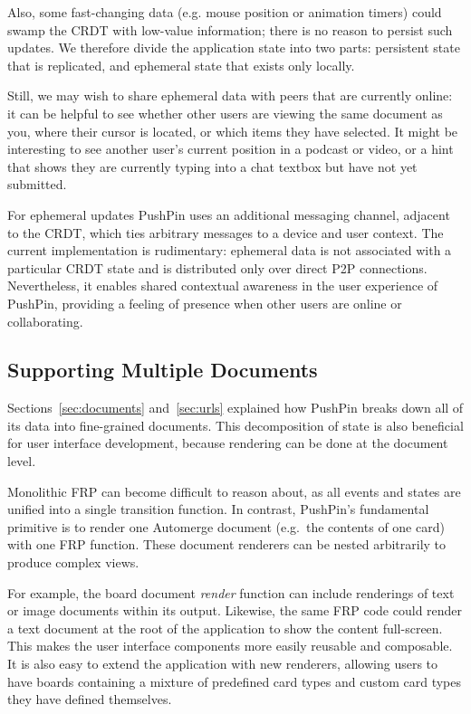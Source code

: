 \documentclass[sigplan,10pt]{acmart}
\begin{document}
Also, some fast-changing data (e.g. mouse position or animation timers) could swamp the CRDT with low-value information; there is no reason to persist such updates.
We therefore divide the application state into two parts: persistent state that is replicated, and ephemeral state that exists only locally.

Still, we may wish to share ephemeral data with peers that are currently online: it can be helpful to see whether other users are viewing the same document as you, where their cursor is located, or which items they have selected. It might be interesting to see another user's current position in a podcast or video, or a hint that shows they are currently typing into a chat textbox but have not yet submitted.

For ephemeral updates PushPin uses an additional messaging channel, adjacent to the CRDT, which ties arbitrary messages to a device and user context. The current implementation is rudimentary: ephemeral data is not associated with a particular CRDT state and is distributed only over direct P2P connections. Nevertheless, it enables shared contextual awareness in the user experience of PushPin, providing a feeling of presence when other users are online or collaborating.

\subsection{Supporting Multiple Documents}

Sections~\ref{sec:documents} and~\ref{sec:urls} explained how PushPin breaks down all of its data into fine-grained documents.
This decomposition of state is also beneficial for user interface development, because rendering can be done at the document level.

Monolithic FRP can become difficult to reason about, as all events and states are unified into a single transition function. In contrast, PushPin's fundamental primitive is to render one Automerge document (e.g.\ the contents of one card) with one FRP function. These document renderers can be nested arbitrarily to produce complex views.

For example, the board document \emph{render} function can include renderings of text or image documents within its output. Likewise, the same FRP code could render a text document at the root of the application to show the content full-screen. This makes the user interface components more easily reusable and composable.
It is also easy to extend the application with new renderers, allowing users to have boards containing a mixture of predefined card types and custom card types they have defined themselves.
\end{document}
